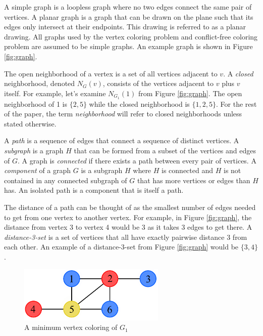 \documentclass{sig-alternate}
\begin{document}
A simple graph is a loopless graph where no two edges connect the same pair of vertices. A planar graph is a graph that can be drawn on the plane such that its edges only intersect at their endpoints. This drawing is referred to as a planar drawing. All graphs used by the vertex coloring problem and conflict-free coloring problem are assumed to be simple graphs. An example graph is shown in Figure \ref{fig:graph}.

The open neighborhood of a vertex is a set of all vertices adjacent to $v$. A \emph{closed} neighborhood, denoted $N_G(v)$, consists of the vertices adjacent to $v$ plus $v$ itself. For example, let's examine $N_{G_1}(1)$ from Figure \ref{fig:graph}. The open neighborhood of 1 is $\{2, 5\}$ while the closed neighborhood is $\{1, 2, 5\}$. For the rest of the paper, the term \emph{neighborhood} will refer to closed neighborhoods unless stated otherwise.

A \emph{path} is a sequence of edges that connect a sequence of distinct vertices. A \emph{subgraph} is a graph $H$ that can be formed from a subset of the vertices and edges of $G$. A graph is \emph{connected} if there exists a path between every pair of vertices. A \emph{component} of a graph $G$ is a subgraph $H$ where $H$ is connected and $H$ is not contained in any connected subgraph of $G$ that has more vertices or edges than $H$ has. An isolated path is a component that is itself a path.

The distance of a path can be thought of as the smallest number of edges needed to get from one vertex to another vertex. For example, in Figure \ref{fig:graph}, the distance from vertex 3 to vertex 4 would be 3 as it takes 3 edges to get there. A \emph{distance-3-set} is a set of vertices that all have exactly pairwise distance 3 from each other. An example of a distance-3-set from Figure \ref{fig:graph} would be $\{3,4\}$. \cite{bondy1976graph,west2001introduction}

\begin{figure}[h]
	\centering
	\includegraphics[width=7cm]{../figures/example-vcp.pdf}
	\caption{A minimum vertex coloring of $G_1$}\label{fig:vcp-example}
\end{figure}
\end{document}
